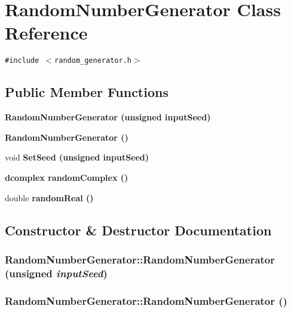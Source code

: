 \section{Random\-Number\-Generator Class Reference}
\label{classRandomNumberGenerator}
{\tt \#include $<$random\_\-generator.h$>$}

\subsection*{Public Member Functions}
\begin{CompactItemize}
\item 
\bf{Random\-Number\-Generator} (unsigned input\-Seed)
\item 
\bf{Random\-Number\-Generator} ()
\item 
void \bf{Set\-Seed} (unsigned input\-Seed)
\item 
\bf{dcomplex} \bf{random\-Complex} ()
\item 
double \bf{random\-Real} ()
\end{CompactItemize}


\subsection{Constructor \& Destructor Documentation}
\subsubsection{\setlength{\rightskip}{0pt plus 5cm}Random\-Number\-Generator::Random\-Number\-Generator (unsigned {\em input\-Seed})\hspace{0.3cm}{\tt  [inline]}}\label{classRandomNumberGenerator_9bdea5d9421900f473154836090b1f5e}


\subsubsection{\setlength{\rightskip}{0pt plus 5cm}Random\-Number\-Generator::Random\-Number\-Generator ()\hspace{0.3cm}{\tt  [inline]}}\label{classRandomNumberGenerator_c7c344f940b51eee37f55c8f8dc49320}




